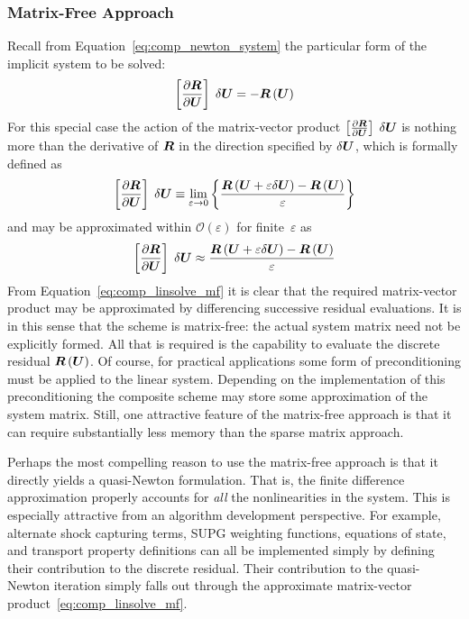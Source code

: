 \subsubsection{Matrix-Free Approach\label{sec:comp_linsolve_mf}}
Recall from Equation~\eqref{eq:comp_newton_system} the particular form of the implicit system to be solved:
\begin{equation*}
  \left[{\frac{\partial{{\boldsymbol{R}}}}{\partial{{\boldsymbol{U}}}}}\right]\;\delta{\boldsymbol{U}} = -{\boldsymbol{R}}\left({\boldsymbol{U}}\right)
\end{equation*}
For this special case the action of the matrix-vector product $\left[{\frac{\partial{{\boldsymbol{R}}}}{\partial{{\boldsymbol{U}}}}}\right]\;\delta{\boldsymbol{U}}$ is nothing more than the derivative of ${\boldsymbol{R}}$ in the direction specified by $\delta{\boldsymbol{U}}$, which is formally defined as
\begin{equation*}
  \left[{\frac{\partial{{\boldsymbol{R}}}}{\partial{{\boldsymbol{U}}}}}\right]\;\delta{\boldsymbol{U}} \equiv \lim_{\varepsilon\rightarrow 0} \left\{\frac{{\boldsymbol{R}}\left({\boldsymbol{U}} + \varepsilon \delta {\boldsymbol{U}}\right) - {\boldsymbol{R}}\left({\boldsymbol{U}}\right)}{\varepsilon}\right\}
\end{equation*}
and may be approximated within $\mathcal{O}\left(\varepsilon\right)$ for finite~$\varepsilon$ as
\begin{equation}
  \left[{\frac{\partial{{\boldsymbol{R}}}}{\partial{{\boldsymbol{U}}}}}\right]\;\delta{\boldsymbol{U}} \approx \frac{{\boldsymbol{R}}\left({\boldsymbol{U}} + \varepsilon \delta {\boldsymbol{U}}\right) - {\boldsymbol{R}}\left({\boldsymbol{U}}\right)}{\varepsilon}
  \label{eq:comp_linsolve_mf}
\end{equation}
From Equation~\eqref{eq:comp_linsolve_mf} it is clear that the required matrix-vector product may be approximated by differencing successive residual evaluations.  It is in this sense that the scheme is matrix-free: the actual system matrix need not be explicitly formed.  All that is required is the capability to evaluate the discrete residual ${\boldsymbol{R}}\left({\boldsymbol{U}}\right)$.  Of course, for practical applications some form of preconditioning must be applied to the linear system. Depending on the implementation of this preconditioning the composite scheme may store some approximation of the system matrix.  Still, one attractive feature of the matrix-free approach is that it can require substantially less memory than the sparse matrix approach.

Perhaps the most compelling reason to use the matrix-free approach is that it directly yields a quasi-Newton formulation.  That is, the finite difference approximation properly accounts for \emph{all} the nonlinearities in the system.  This is especially attractive from an algorithm development perspective.  For example, alternate shock capturing terms, SUPG weighting functions, equations of state, and transport property definitions can all be implemented simply by defining their contribution to the discrete residual. Their contribution to the quasi-Newton iteration simply falls out through the approximate matrix-vector product~\eqref{eq:comp_linsolve_mf}.

